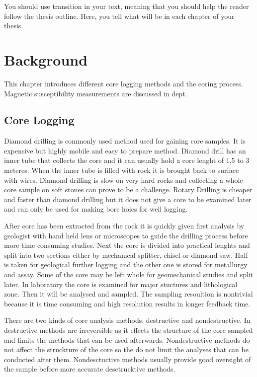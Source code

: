 \documentclass[12pt,a4paper,oneside,pdftex]{report}
\begin{document}
You should use transition in your text, meaning that you should help
the reader follow the thesis outline. Here, you tell what will be in
each chapter of your thesis.



% 

\chapter{Background}
\label{chapter:background}

This chapter introduces different core logging methods and the coring process. 
Magnetic susceptibility measurements are discussed in dept.

\section{Core Logging}

Diamond drilling is commonly used method used for gaining core samples. It is expensive but highly
mobile and easy to prepare method. Diamond drill has an inner tube that collects the core and it can 
usually  hold a core lenght of 1,5 to 3 meteres. When the inner tube is filled with rock it is brought
back to surface with wires. Diamond drilling is slow on very hard rocks and collecting a whole core
sample on soft stones can prove to be a challenge. Rotary Drilling is cheaper and faster than diamond
drilling but it does not give a core to be examined later and can only be used for making bore holes
for well logging.\cite{Peters1987}

After core has been extracted from the rock it is quickly given first analysis by geologist with 
hand held lens or microscopes to guide the drilling process before more time consuming studies. 
Next the core is divided into practical lenghts and split into two
sections either by mechanical splitter, chisel or diamond saw. Half is taken for geological further
logging and the other one is stored for metallurgy and assay. Some of the core may be left whole
for geomechanical studies and split later. In laboratory the core is examined for major 
stuctures and lithological zone. Then it will be analysed and sampled. The sampling resoultion 
is nontrivial because it is time consuming and high resolution results in longer feedback time.\cite{Peters1987}

There are two kinds of core analysis methods, destructive and nondestructive. In destructive methods
are irreversible as it effects the structure of the core sampled and limits the methods that can be used
afterwards. Nondestructive methods do not affect the struckture of the core so the do not limit the 
analyses that can be conducted after them. Nondesctuctive methods usually provide good oversight of the
sample before more accurate desctrucktive methods.
\end{document}
